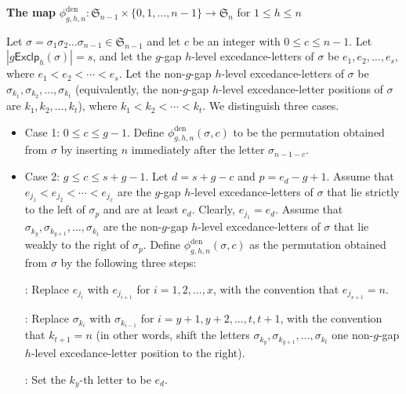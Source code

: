 \documentclass[12pt]{article}
\begin{document}
\vskip 0pt
\begin{framed}
\begin{center}
\vskip -8pt
{\bf{The map}} $\phi_{g,h,n}^{\text{den}}: \mathfrak{S}_{n-1}\times\{0,1,\ldots,n-1\}\rightarrow\mathfrak{S}_{n}$ for $1\leq h\leq n$
\end{center}
\vskip -8pt

	Let $\sigma=\sigma_{1}\sigma_{2}\ldots\sigma_{n-1}\in\mathfrak{S}_{n-1}$ and let $c$ be an integer with $0\leq c\leq n-1$.
	Let $|g\textsf{Exclp}_{h}(\sigma)|=s$, and let the $g$-gap $h$-level excedance-letters of $\sigma$ be $e_{1},e_{2},\ldots,e_{s}$,
	where $e_{1}<e_{2}<\cdots<e_{s}$.
	Let the non-$g$-gap $h$-level excedance-letters of $\sigma$ be $\sigma_{k_{1}},\sigma_{k_{2}},\ldots,\sigma_{k_{t}}$ (equivalently, the non-$g$-gap $h$-level excedance-letter positions of $\sigma$ are $k_{1},k_{2},\ldots,k_{t}$),
	where $k_{1}<k_{2}<\cdots<k_{t}$.
	We distinguish three cases.
	\begin{itemize}[leftmargin=1.5em]
		\item[$\bullet$]
		Case 1: $0\leq c\leq g-1$.  
		Define $\phi_{g,h,n}^{\text{den}}(\sigma,c)$ to be the permutation obtained from $\sigma$ by inserting $n$ immediately after the letter $\sigma_{n-1-c}$.
		
		\item[$\bullet$] 
		Case 2: $g\leq c\leq s+g-1$.  
		Let $d=s+g-c$ and $p=e_{d}-g+1$.
		Assume that $e_{j_{1}}<e_{j_{2}}<\cdots<e_{j_{x}}$ are the $g$-gap $h$-level excedance-letters of $\sigma$ that lie strictly to the left of $\sigma_{p}$ and are at least $e_{d}$.
		Clearly, $e_{j_{1}}=e_{d}$.
		Assume that $\sigma_{k_{y}},\sigma_{k_{y+1}},\ldots,\sigma_{k_{t}}$ are the non-$g$-gap $h$-level excedance-letters of $\sigma$ that lie weakly to the right of $\sigma_{p}$.
		Define $\phi_{g,h,n}^{\text{den}}(\sigma,c)$  as the permutation obtained from $\sigma$ by the following three steps:
		
		\textbf{}: Replace $e_{j_{i}}$ with $e_{j_{i+1}}$ for  $i=1,2,\ldots,x$, with the convention that $e_{j_{x+1}}=n$.
		
		\textbf{}: Replace $\sigma_{k_{i}}$ with $\sigma_{k_{i-1}}$ for $i=y+1,y+2,\ldots,t,t+1$, with the convention that $k_{t+1}=n$
		(in other words, shift the letters $\sigma_{k_{y}},\sigma_{k_{y+1}},\ldots,\sigma_{k_{t}}$ one non-$g$-gap $h$-level excedance-letter position to the right).
		
		\textbf{}: Set the $k_{y}$-th letter to be $e_{d}$.  
		

\end{itemize}
\end{framed}
\end{document}
